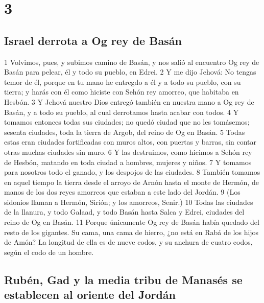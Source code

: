 \chapter{3}

\section{Israel derrota a Og rey de Basán}

1 Volvimos, pues, y subimos camino de Basán, y nos salió al encuentro Og rey de Basán para pelear, él y todo su pueblo, en Edrei.
2 Y me dijo Jehová: No tengas temor de él, porque en tu mano he entregdo a él y a todo su pueblo, con su tierra; y harás con él como hiciste con Sehón rey amorreo, que habitaba en Hesbón.
3 Y Jehová nuestro Dios entregó también en nuestra mano a Og rey de Basán, y a todo su pueblo, al cual derrotamos hasta acabar con todos.
4 Y tomamos entonces todas sus ciudades; no quedó ciudad que no les tomásemos; sesenta ciudades, toda la tierra de Argob, del reino de Og en Basán.
5 Todas estas eran ciudades fortificadas con muros altos, con puertas y barras, sin contar otras muchas ciudades sin muro.
6 Y las destruimos, como hicimos a Sehón rey de Hesbón, matando en toda ciudad a hombres, mujeres y niños.
7 Y tomamos para nosotros todo el ganado, y los despojos de las ciudades.
8 También tomamos en aquel tiempo la tierra desde el arroyo de Arnón hasta el monte de Hermón, de manos de los dos reyes amorreos que estaban a este lado del Jordán.
9 (Los sidonios llaman a Hermón, Sirión; y los amorreos, Senir.)
10 Todas las ciudades de la llanura, y todo Galaad, y todo Basán hasta Salca y Edrei, ciudades del reino de Og en Basán.
11 Porque únicamente Og rey de Basán había quedado del resto de los gigantes. Su cama, una cama de hierro, ¿no está en Rabá de los hijos de Amón? La longitud de ella es de nueve codos,  y su anchura de cuatro codos, según el codo de un hombre.

\section*{Rubén, Gad y la media tribu de Manasés se establecen al oriente del Jordán}

